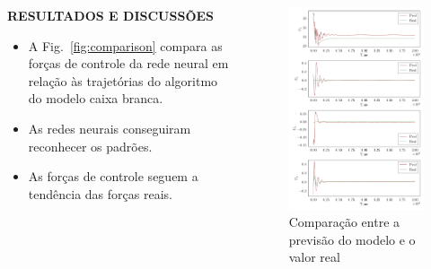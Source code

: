 \documentclass[serif,20pt]{beamer}
\begin{document}
\begin{frame}[t]
\begin{columns}[t]
\begin{block}{\centering\bfseries RESULTADOS E DISCUSSÕES}
\vspace{1cm}
\begin{itemize}\justifying
    \item A Fig.~\ref{fig:comparison} compara as forças de controle da rede neural em relação às trajetórias do algoritmo do modelo caixa branca.
\end{itemize}
\begin{itemize}
    \item As redes neurais conseguiram reconhecer os padrões.
    \item As forças de controle seguem a tendência das forças reais.
\end{itemize}
\end{block}



\begin{block}{}

\begin{figure}[H]
    \centering
    \caption{Comparação entre a previsão do modelo e o valor real}
    \includegraphics[width=\columnwidth]{../../../report/figures/4results/uav/forces_denormalized.pdf}


\end{figure}
\end{block}
\end{columns}
\end{frame}
\end{document}
